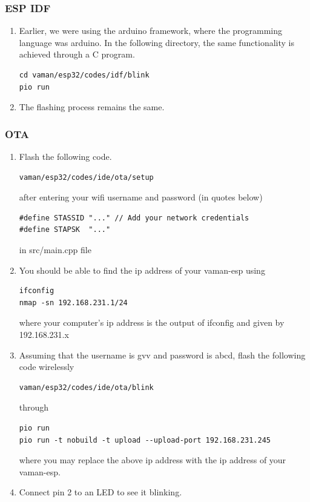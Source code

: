 \subsubsection{ESP IDF}
\renewcommand{\theequation}{\theenumi}
\renewcommand{\thefigure}{\theenumi}
\begin{enumerate}[label=\thesection.\arabic*.,ref=\thesection.\theenumi]
\item Earlier, we were using the arduino framework, where the programming language was arduino.  In the following directory, the same functionality is achieved through a C program.
\begin{lstlisting}
cd vaman/esp32/codes/idf/blink
pio run
\end{lstlisting}
\item The flashing process remains the same.
\end{enumerate}


\subsubsection{OTA}
\renewcommand{\theequation}{\theenumi}
\renewcommand{\thefigure}{\theenumi}
\begin{enumerate}[label=\thesection.\arabic*.,ref=\thesection.\theenumi]
\fi
\item Flash the following code. 
\begin{lstlisting}
vaman/esp32/codes/ide/ota/setup
\end{lstlisting}
		after entering your wifi username and password (in quotes below)
\begin{lstlisting}
#define STASSID "..." // Add your network credentials
#define STAPSK  "..."
\end{lstlisting}
in src/main.cpp file
\item You should be able to find the ip address of your vaman-esp using 
\begin{lstlisting}
ifconfig
nmap -sn 192.168.231.1/24
\end{lstlisting}
where your computer's ip address is the output of ifconfig and given by 192.168.231.x
\item Assuming that the username is gvv and password is abcd, flash the following code wirelessly
\begin{lstlisting}
vaman/esp32/codes/ide/ota/blink
\end{lstlisting}
through 
\begin{lstlisting}
pio run 
pio run -t nobuild -t upload --upload-port 192.168.231.245
\end{lstlisting}
where you may replace the above ip address with the ip address of your vaman-esp.
\item Connect pin 2 to an LED  to see it blinking.
	\iffalse
\end{enumerate}
